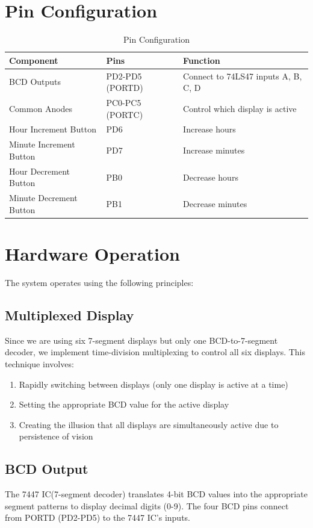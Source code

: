 \documentclass[12pt]{article}
\begin{document}
\section{Pin Configuration}

\begin{table}[h]
\centering
\begin{tabular}{|l|l|l|}
\hline
\textbf{Component} & \textbf{Pins} & \textbf{Function} \\
\hline
BCD Outputs & PD2-PD5 (PORTD) & Connect to 74LS47 inputs A, B, C, D \\
\hline
Common Anodes & PC0-PC5 (PORTC) & Control which display is active \\
\hline
Hour Increment Button & PD6 & Increase hours \\
\hline
Minute Increment Button & PD7 & Increase minutes \\
\hline
Hour Decrement Button & PB0 & Decrease hours \\
\hline
Minute Decrement Button & PB1 & Decrease minutes \\
\hline
\end{tabular}
\caption{Pin Configuration}
\end{table}

\section{Hardware Operation}
The system operates using the following principles:

\subsection{Multiplexed Display}
Since we are using six 7-segment displays but only one BCD-to-7-segment decoder, we implement time-division multiplexing to control all six displays. This technique involves:

\begin{enumerate}
    \item Rapidly switching between displays (only one display is active at a time)
    \item Setting the appropriate BCD value for the active display
    \item Creating the illusion that all displays are simultaneously active due to persistence of vision
\end{enumerate}

\subsection{BCD Output}
The 7447 IC(7-segment decoder) translates 4-bit BCD values into the appropriate segment patterns to display decimal digits (0-9). The four BCD pins connect from PORTD (PD2-PD5) to the 7447 IC's inputs.
\end{document}
